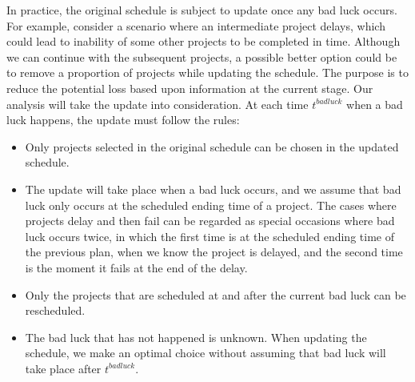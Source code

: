 \documentclass[final,3p,times]{elsarticle}
\begin{document}
In practice, the original schedule is subject to update once any bad luck occurs. For example, consider a scenario where an intermediate project delays, which could lead to inability of some other projects to be completed in time. Although we can continue with the subsequent projects, a possible better option could be to remove a proportion of projects while updating the schedule. The purpose is to reduce the potential loss based upon information at the current stage. Our analysis will take the update into consideration. At each time $t^{badluck}$ when a bad luck happens, the update must follow the rules:
\begin{itemize}
	\item Only projects selected in the original schedule can be chosen in the updated schedule.
	\item The update will take place when a bad luck occurs, and we assume that bad luck only occurs at the scheduled ending time of a project. The cases where projects delay and then fail can be regarded as special occasions where bad luck occurs twice, in which the first time is at the scheduled ending time of the previous plan, when we know the project is delayed, and the second time is the moment it fails at the end of the delay.
	\item Only the projects that are scheduled at and after the current bad luck can be rescheduled.
	\item The bad luck that has not happened is unknown. When updating the schedule, we make an optimal choice without assuming that bad luck will take place after $t^{badluck}$. 
\end{itemize}
\end{document}
